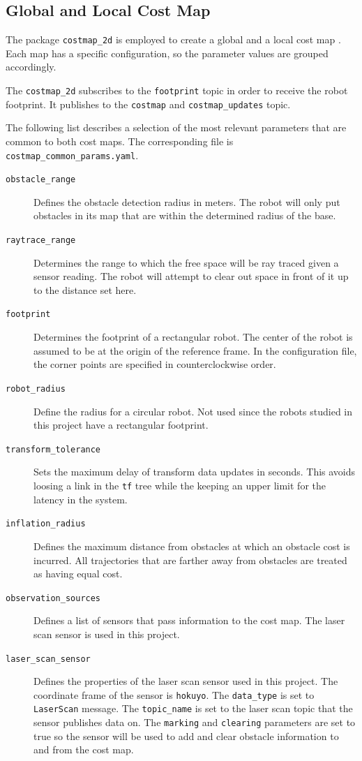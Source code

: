 \documentclass[10pt,journal,compsoc]{IEEEtran}
\begin{document}
\subsection{Global and Local Cost Map}
The package \texttt{costmap\_2d} is employed to create a global and a local cost map \cite{ros_wiki_costmap_2d}. Each map has a specific configuration, so the parameter values are grouped accordingly.

The \texttt{costmap\_2d} subscribes to the \texttt{footprint} topic in order to receive the robot footprint. It publishes to the \texttt{costmap} and \texttt{costmap\_updates} topic.

The following list describes a selection of the most relevant parameters that are common to both cost maps. The corresponding file is \texttt{costmap\_common\_params.yaml}.
\begin{description}
\item[\texttt{obstacle\_range}] Defines the obstacle detection radius in meters. The robot will only put obstacles in its map that are within the determined radius of the base.
\item[\texttt{raytrace\_range}] Determines the range to which the free space will be ray traced given a sensor reading. The robot will attempt to clear out space in front of it up to the distance set here.
\item[\texttt{footprint}] Determines the footprint of a rectangular robot. The center of the robot is assumed to be at the origin of the reference frame. In the configuration file, the corner points are specified in counterclockwise order.
\item[\texttt{robot\_radius}] Define the radius for a circular robot. Not used since the robots studied in this project have a rectangular footprint.
\item[\texttt{transform\_tolerance}] Sets the maximum delay of transform data updates in seconds. This avoids loosing a link in the \texttt{tf} tree while the keeping an upper limit for the latency in the system.
\item[\texttt{inflation\_radius}] Defines the maximum distance from obstacles at which an obstacle cost is incurred. All trajectories that are farther away from obstacles are treated as having equal cost.
\item[\texttt{observation\_sources}] Defines a list of sensors that pass information to the cost map. The laser scan sensor is used in this project.
\item[\texttt{laser\_scan\_sensor}] Defines the properties of the laser scan sensor used in this project. The coordinate frame of the sensor is \texttt{hokuyo}. The \texttt{data\_type} is set to \texttt{LaserScan} message. The \texttt{topic\_name} is set to the laser scan topic that the sensor publishes data on. The \texttt{marking} and \texttt{clearing} parameters are set to true so the sensor will be used to add and clear obstacle information to and from the cost map.
\end{description}
\end{document}
